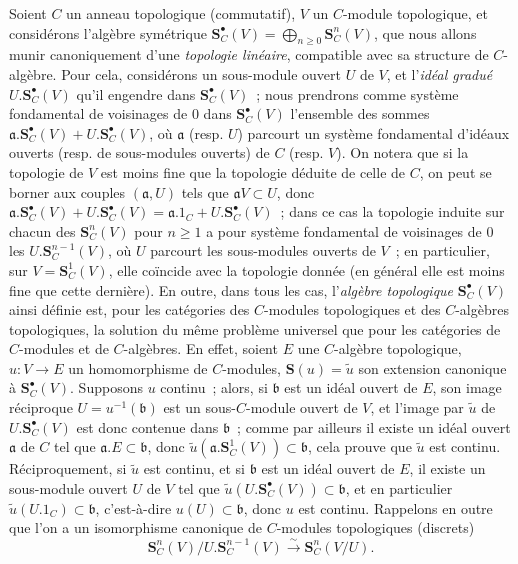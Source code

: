 \begin{env}[19.5.1]
\label{0.19.5.1-fr}
Soient $C$ un anneau topologique (commutatif), $V$ un $C$-module topologique,
et considérons l'algèbre symétrique
$\mathbf S_C^\bullet(V)=\bigoplus_{n\geq0}\mathbf S_C^n(V)$, que nous allons munir
canoniquement d'une \emph{topologie linéaire}, compatible avec sa structure de
$C$-algèbre. Pour cela, considérons un sous-module ouvert $U$ de $V$, et
l'\emph{idéal gradué} $U.\mathbf S_C^\bullet(V)$ qu'il engendre dans
$\mathbf S_C^\bullet(V)$~; nous prendrons comme système fondamental de voisinages de
$0$ dans $\mathbf S_C^\bullet(V)$ l'ensemble des sommes
$\mathfrak a.\mathbf S_C^\bullet(V)+U.\mathbf S_C^\bullet(V)$, où $\mathfrak a$ (resp.
$U$) parcourt un système fondamental d'idéaux ouverts (resp. de sous-modules
ouverts) de $C$ (resp. $V$). On notera que si la topologie de $V$ est moins
fine que la topologie déduite de celle de $C$, on peut se borner aux couples
$(\mathfrak a,U)$ tels que $\mathfrak aV\subset U$, donc
$\mathfrak a.\mathbf S_C^\bullet(V)+U.\mathbf S_C^\bullet(V)
=\mathfrak a.1_C+U.\mathbf S_C^\bullet(V)$~; dans ce cas la topologie induite sur
chacun des $\mathbf S_C^n(V)$ pour $n\geq1$ a pour système fondamental de
voisinages de $0$ les $U.\mathbf S_C^{n-1}(V)$, où $U$ parcourt les
sous-modules ouverts de $V$~; en particulier, sur $V=\mathbf S_C^1(V)$, elle
coïncide avec la topologie donnée (en général elle est moins fine que cette
dernière). En outre, dans tous les cas, l'\emph{algèbre topologique}
$\mathbf S_C^\bullet(V)$ ainsi définie est, pour les catégories des $C$-modules
topologiques et des $C$-algèbres topologiques, la solution du même problème
universel que pour les catégories de $C$-modules et de $C$-algèbres. En effet,
soient $E$ une $C$-algèbre topologique, $u:V\to E$ un homomorphisme de
$C$-modules, $\mathbf S(u)=\widetilde u$ son extension canonique à
$\mathbf S_C^\bullet(V)$. Supposons $u$ continu~; alors, si $\mathfrak b$ est un
idéal ouvert de $E$, son image réciproque $U=u^{-1}(\mathfrak b)$ est un
sous-$C$-module ouvert de $V$, et l'image par $\widetilde u$ de
$U.\mathbf S_C^\bullet(V)$ est donc contenue dans $\mathfrak b$~; comme par ailleurs
il existe un idéal ouvert $\mathfrak a$ de $C$ tel que
$\mathfrak a.E\subset\mathfrak b$, donc
$\widetilde u(\mathfrak a.\mathbf S_C^1(V))\subset\mathfrak b$, cela prouve
que $\widetilde u$ est continu. Réciproquement, si $\widetilde u$ est continu,
et si $\mathfrak b$ est un idéal ouvert de $E$, il existe un sous-module ouvert
$U$ de $V$ tel que $\widetilde u(U.\mathbf S_C^\bullet(V))\subset\mathfrak b$, et en
particulier $\widetilde u(U.1_C)\subset\mathfrak b$, c'est-à-dire
$u(U)\subset\mathfrak b$, donc $u$ est continu. Rappelons en outre que l'on a
un isomorphisme canonique de $C$-modules topologiques (discrets)
\begin{equation}
\label{0.19.5.1.1-fr}
  \mathbf S_C^n(V)/U.\mathbf S_C^{n-1}(V)
  \xrightarrow{\sim}\mathbf S_C^n(V/U).
  \tag{19.5.1.1}
\end{equation}
\end{env}

